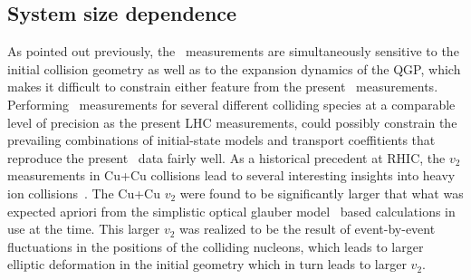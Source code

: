 \subsection{System size dependence}
\label{sec:flow_sizedep}

As pointed out previously, the \vn\ measurements are simultaneously
  sensitive to the initial collision geometry as well as to the 
  expansion dynamics of the QGP, which makes it difficult to 
  constrain either feature from the present \vn\ measurements.
Performing \vn\ measurements for several different colliding species
  at a comparable level of precision as the present LHC measurements,  
  could possibly constrain the prevailing combinations of initial-state 
  models and transport coeffitients that reproduce the present \vn\ data 
  fairly well.
As a historical precedent at RHIC, the $v_2$ measurements in Cu+Cu 
  collisions lead to several interesting insights into heavy ion 
  collisions~\cite{RHIC_CU_CU}.
The Cu+Cu $v_2$ were found to be significantly larger that what was 
  expected apriori from the simplistic optical glauber model~\cite{OPTICAL_GLAUBER}
  based calculations in use at the time.
This larger $v_2$ was realized to be the result of event-by-event fluctuations
  in the positions of the colliding nucleons, which leads to larger
  elliptic deformation in the initial geometry which in turn leads 
  to larger $v_2$.


